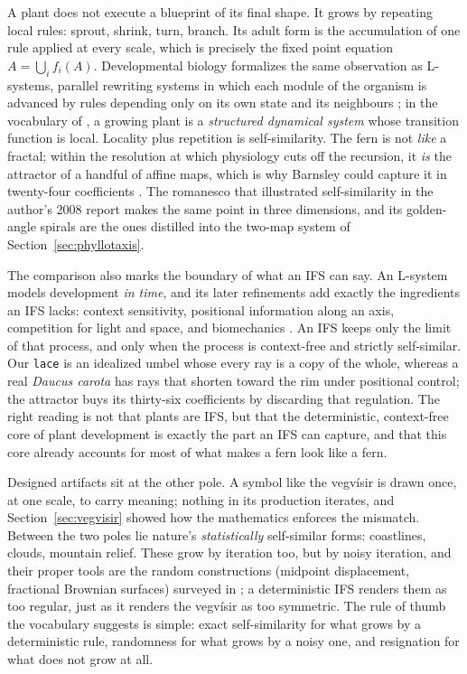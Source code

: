 \documentclass[11pt,a4paper]{article}
\theoremstyle{remark}
\begin{document}
A plant does not execute a blueprint of its final shape. It grows by
repeating local rules: sprout, shrink, turn, branch. Its adult form is the
accumulation of one rule applied at every scale, which is precisely the
fixed point equation $A = \bigcup_i f_i(A)$. Developmental biology
formalizes the same observation as L-systems, parallel rewriting systems in
which each module of the organism is advanced by rules depending only on its
own state and its neighbours \cite{prusinkiewicz1990}; in the vocabulary of
\cite{prusinkiewicz2003}, a growing plant is a \emph{structured dynamical
system} whose transition function is local. Locality plus repetition is
self-similarity. The fern is not \emph{like} a fractal; within the
resolution at which physiology cuts off the recursion, it \emph{is} the
attractor of a handful of affine maps, which is why Barnsley could capture
it in twenty-four coefficients \cite{barnsleydemko1985}. The romanesco that
illustrated self-similarity in the author's 2008 report
\cite{bonhomme2008paysagesfractals} makes the same point in three dimensions, and its
golden-angle spirals are the ones distilled into the two-map system of
Section~\ref{sec:phyllotaxis}.

The comparison also marks the boundary of what an IFS can say. An L-system
models development \emph{in time}, and its later refinements add exactly the
ingredients an IFS lacks: context sensitivity, positional information along
an axis, competition for light and space, and biomechanics
\cite{prusinkiewicz2003}. An IFS keeps only the limit of that process, and
only when the process is context-free and strictly self-similar. Our
\texttt{lace} is an idealized umbel whose every ray is a copy of the whole,
whereas a real \emph{Daucus carota} has rays that shorten toward the rim
under positional control; the attractor buys its thirty-six coefficients by
discarding that regulation. The right reading is not that plants are IFS,
but that the deterministic, context-free core of plant development is
exactly the part an IFS can capture, and that this core already accounts for
most of what makes a fern look like a fern.

Designed artifacts sit at the other pole. A symbol like the vegvísir is
drawn once, at one scale, to carry meaning; nothing in its production
iterates, and Section~\ref{sec:vegvisir} showed how the mathematics
enforces the mismatch. Between the two poles lie nature's
\emph{statistically} self-similar forms: coastlines, clouds, mountain
relief. These grow by iteration too, but by noisy iteration, and their
proper tools are the random constructions (midpoint displacement, fractional
Brownian surfaces) surveyed in \cite{mandelbrot1982,bonhomme2008paysagesfractals}; a
deterministic IFS renders them as too regular, just as it renders the
vegvísir as too symmetric. The rule of thumb the vocabulary suggests is
simple: exact self-similarity for what grows by a deterministic rule,
randomness for what grows by a noisy one, and resignation for what does not
grow at all.
\end{document}

